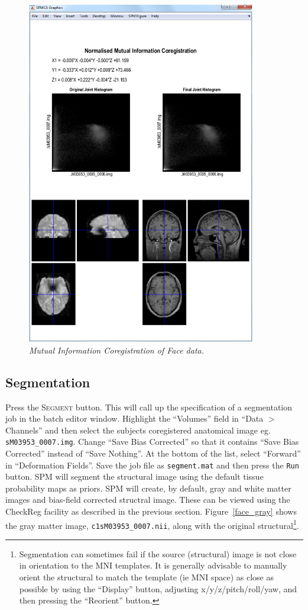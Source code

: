 \begin{figure}
\begin{center}
\includegraphics[width=100mm]{faces/coreg}
\caption{\em Mutual Information Coregistration of Face data.\label{face_coreg}}
\end{center}
\end{figure}

\subsection{Segmentation}

Press the \textsc{Segment} button. This will call up the specification of a segmentation job in the batch editor window. Highlight the ``Volumes'' field in ``Data $>$ Channels'' and then select the subjects coregistered anatomical image eg. \texttt{sM03953\_0007.img}. Change ``Save Bias Corrected'' so that it contains ``Save Bias Corrected'' instead of ``Save Nothing''. At the bottom of the list, select ``Forward'' in ``Deformation Fields''. Save the job file as \texttt{segment.mat} and then press the \texttt{Run} button. SPM will segment the structural image using the default tissue probability maps as priors. 
SPM will create, by default, gray and white matter images and bias-field corrected structral image. These can be viewed using the CheckReg facility as described in the previous section. Figure~\ref{face_gray} shows the gray matter image, \texttt{c1sM03953\_0007.nii}, along with the original structural\footnote{Segmentation can sometimes fail if the source (structural) image is not close in orientation to the MNI templates. It is generally advisable to manually orient the structural to match the template (ie MNI space) as close as possible by using the ``Display'' button, adjusting x/y/z/pitch/roll/yaw, and then pressing the ``Reorient'' button.}.

